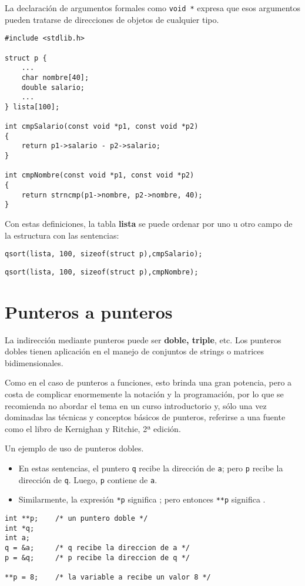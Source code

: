 \begin{ejemplo}
La declaración de argumentos formales como \lstinline{void *} expresa que esos argumentos pueden tratarse de
direcciones de objetos de cualquier tipo.
\begin{lstlisting}
#include <stdlib.h>

struct p {
    ...
    char nombre[40];
    double salario;
    ...
} lista[100];

int cmpSalario(const void *p1, const void *p2)
{
    return p1->salario - p2->salario;
}

int cmpNombre(const void *p1, const void *p2)
{
    return strncmp(p1->nombre, p2->nombre, 40);
}
\end{lstlisting}

Con estas definiciones, la tabla \textbf{lista} se puede ordenar por uno u otro campo de
la estructura con las sentencias:
\begin{lstlisting}
qsort(lista, 100, sizeof(struct p),cmpSalario);
\end{lstlisting}
\begin{lstlisting}
qsort(lista, 100, sizeof(struct p),cmpNombre);
\end{lstlisting}
\end{ejemplo}


\section{Punteros a punteros}
La indirección mediante punteros puede ser \textbf{doble, triple}, etc. Los punteros
dobles tienen aplicación en el manejo de conjuntos de strings o matrices
bidimensionales. 

Como en el caso de punteros a funciones, esto brinda una gran
potencia, pero a costa de complicar enormemente la notación y la programación,
por lo que se recomienda no abordar el tema en un curso introductorio y, sólo
una vez dominadas las técnicas y conceptos básicos de punteros, referirse a una
fuente como el libro de Kernighan y Ritchie, 2ª edición.

\begin{ejemplo}
Un ejemplo de uso de punteros dobles. 
\begin{itemize}
	\item En estas sentencias, el puntero \lstinline{q} recibe la dirección de \lstinline{a}; pero \lstinline{p} recibe la dirección de \lstinline{q}. Luego, \lstinline{p} contiene  de \lstinline{a}. 
	\item Similarmente, la expresión \lstinline{*p} significa ; pero entonces \lstinline{**p} significa .
\end{itemize}
\begin{lstlisting}
int **p;    /* un puntero doble */
int *q;
int a;
q = &a;		/* q recibe la direccion de a */
p = &q;		/* p recibe la direccion de q */
			
**p = 8;    /* la variable a recibe un valor 8 */
\end{lstlisting}
\end{ejemplo}

